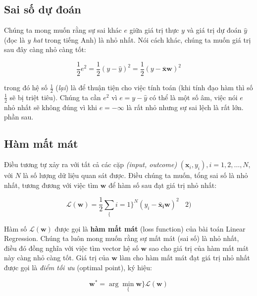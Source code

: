 \subsection{Sai số dự đoán}\label{sai-sux1ed1-dux1ef1-ux111ouxe1n}

Chúng ta mong muốn rằng sự sai khác $e$
giữa giá trị thực $y$ và giá trị dự đoán
$\hat{y}$ (đọc là \emph{y hat} trong
tiếng Anh) là nhỏ nhất. Nói cách khác, chúng ta muốn giá trị sau đây
càng nhỏ càng tốt:

\begin{equation} \frac{1}{2}e^2 = \frac{1}{2}(y - \hat{y})^2 =
\frac{1}{2}(y - \mathbf{\bar{x}}\mathbf{w})^2 \end{equation}

trong đó hệ số $\frac{1}{2} $
(\emph{lại}) là để thuận tiện cho việc tính toán (khi tính đạo hàm thì
số $\frac{1}{2} $ sẽ bị triệt tiêu).
Chúng ta cần $e^2$ vì
$e = y - \hat{y} $ có thể là một số âm,
việc nói $e$ nhỏ nhất sẽ không đúng vì
khi $e = - \infty$ là rất nhỏ nhưng sự
sai lệch là rất lớn. 
phần sau.

\subsection{Hàm mất mát}\label{huxe0m-mux1ea5t-muxe1t}

Điều tương tự xảy ra với tất cả các cặp \emph{(input, outcome)}
$ (\mathbf{x}_i, y_i), i = 1, 2, \dots, N
$, với $N$ là số lượng
dữ liệu quan sát được. Điều chúng ta muốn, tổng sai số là nhỏ nhất,
tương đương với việc tìm $ \mathbf{w} $
để hàm số sau đạt giá trị nhỏ nhất:

\begin{equation} \mathcal{L}(\mathbf{w}) =
\frac{1}{2}\sum_\{i=1\}^N (y_i -
\mathbf{\bar{x}_i}\mathbf{w})^2
~~~~2)
\end{equation}

Hàm số $\mathcal{L}(\mathbf{w}) $ được
gọi là \textbf{hàm mất mát} (loss function) của bài toán Linear
Regression. Chúng ta luôn mong muốn rằng sự mất mát (sai số) là nhỏ
nhất, điều đó đồng nghĩa với việc tìm vector hệ số $
\mathbf{w} $ sao cho giá trị của hàm mất mát này càng
nhỏ càng tốt. Giá trị của $\mathbf{w}$
làm cho hàm mất mát đạt giá trị nhỏ nhất được gọi là \emph{điểm tối ưu}
(optimal point), ký hiệu:

\begin{equation} \mathbf{w}^* = \arg\min_\{\mathbf{w}\}
\mathcal{L}(\mathbf{w}) \end{equation}

